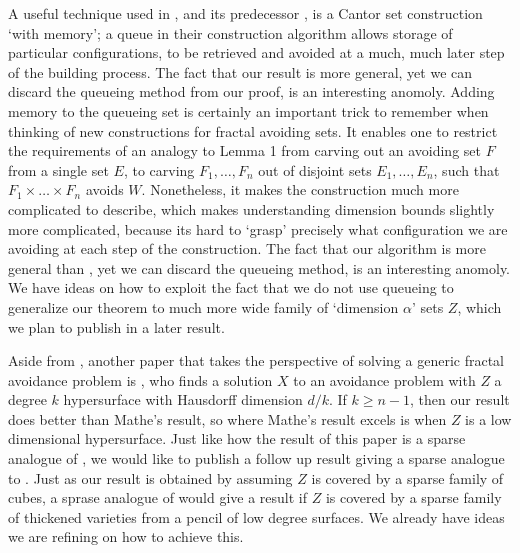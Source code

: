 \documentclass[usenames,dvipsnames]{article}
\theoremstyle{plain}
\theoremstyle{plain}
\begin{document}
A useful technique used in \cite{MalabikaRob}, and its predecessor \cite{KeletiDimOneSet}, is a Cantor set construction `with memory'; a queue in their construction algorithm allows storage of particular configurations, to be retrieved and avoided at a much, much later step of the building process. The fact that our result is more general, yet we can discard the queueing method from our proof, is an interesting anomoly. Adding memory to the queueing set is certainly an important trick to remember when thinking of new constructions for fractal avoiding sets. It enables one to restrict the requirements of an analogy to Lemma 1 from carving out an avoiding set $F$ from a single set $E$, to carving $F_1, \dots, F_n$ out of disjoint sets $E_1, \dots, E_n$, such that $F_1 \times \dots \times F_n$ avoids $W$. Nonetheless, it makes the construction much more complicated to describe, which makes understanding dimension bounds slightly more complicated, because its hard to `grasp' precisely what configuration we are avoiding at each step of the construction. The fact that our algorithm is more general than \cite{MalabikaRob}, yet we can discard the queueing method, is an interesting anomoly. We have ideas on how to exploit the fact that we do not use queueing to generalize our theorem to much more wide family of `dimension $\alpha$' sets $Z$, which we plan to publish in a later result.

Aside from \cite{MalabikaRob}, another paper that takes the perspective of solving a generic fractal avoidance problem is \cite{Mathe}, who finds a solution $X$ to an avoidance problem with $Z$ a degree $k$ hypersurface with Hausdorff dimension $d/k$. If $k \geq n-1$, then our result does better than Mathe's result, so where Mathe's result excels is when $Z$ is a low dimensional hypersurface. Just like how the result of this paper is a sparse analogue of \cite{MalabikaRob}, we would like to publish a follow up result giving a sparse analogue to \cite{Mathe}. Just as our result is obtained by assuming $Z$ is covered by a sparse family of cubes, a sprase analogue of \cite{Mathe} would give a result if $Z$ is covered by a sparse family of thickened varieties from a pencil of low degree surfaces. We already have ideas we are refining on how to achieve this.
\end{document}
